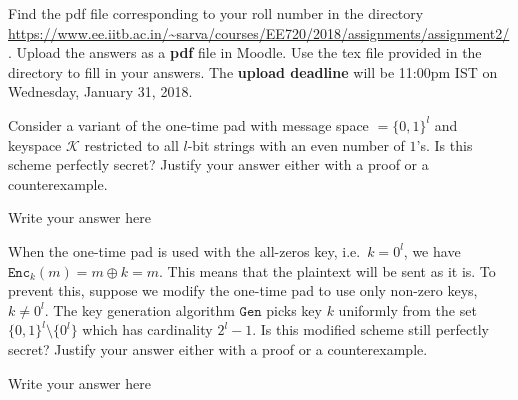 \documentclass[12pt,a4paper,answers]{exam}
\begin{document}
\pagestyle{head}
\headrule
{}
%

\extraheadheight{.4in}%
\extrafootheight{-0.5in}%
\extrawidth{0.5in}%

Find the pdf file corresponding to your roll number in the directory \url{https://www.ee.iitb.ac.in/~sarva/courses/EE720/2018/assignments/assignment2/}. Upload the answers as a \textbf{pdf} file in Moodle. Use the tex file provided in the directory to fill in your answers. The \textbf{upload deadline} will be 11:00pm IST on Wednesday, January 31, 2018.
\begin{questions}
\question[5] Consider a variant of the one-time pad with message space $\mathcal = \{0,1\}^l$ and keyspace $\mathcal{K}$ restricted to all $l$-bit strings with an even number of $1$'s. Is this scheme perfectly secret? Justify your answer either with a proof or a counterexample.
  \begin{solution}
    Write your answer here
  \end{solution}

  \question[5] When the one-time pad is used with the all-zeros key, i.e.~$k = 0^l$, we have $\texttt{Enc}_k(m) = m \oplus k = m$. This means that the plaintext will be sent as it is. To prevent this, suppose we modify the one-time pad to use only non-zero keys, $k \neq 0^l$. The key generation algorithm $\texttt{Gen}$ picks key $k$ uniformly from the set $\{0,1\}^l \setminus \{0^l\}$ which has cardinality $2^l - 1$. Is this modified scheme still perfectly secret? Justify your answer either with a proof or a counterexample.
  \begin{solution}
    Write your answer here
  \end{solution}

  
\end{questions}
\end{document}
